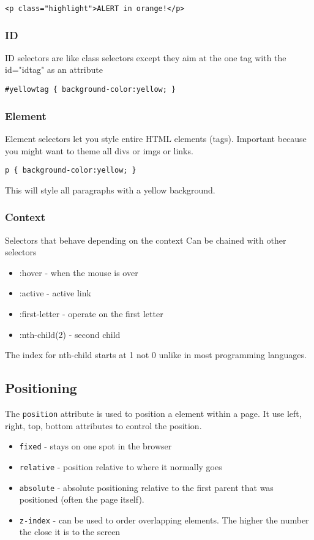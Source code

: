 \documentclass[../CMPUT-404-Notes.tex]{subfiles}
\begin{document}
\begin{verbatim}
<p class="highlight">ALERT in orange!</p>
\end{verbatim}

\subsubsection{ID}
ID selectors are like class selectors except they aim at the one tag with the id="idtag" as an attribute

\begin{verbatim}
#yellowtag { background-color:yellow; }
\end{verbatim}


\subsubsection{Element}
Element selectors let you style entire HTML elements (tags).
Important because you might want to theme all divs or imgs or links. 
\begin{verbatim}
p { background-color:yellow; }
\end{verbatim}
This will style all paragraphs with a yellow background.

\subsubsection{Context}
Selectors that behave depending on the context
Can be chained with other selectors
\begin{itemize}
  \item :hover - when the mouse is over
  \item :active - active link
  \item :first-letter - operate on the first letter
  \item :nth-child(2) - second child
\end{itemize}
\begin{Note}
  The index for nth-child starts at 1 not 0 unlike in most programming languages. 
\end{Note}

\subsection{Positioning}
The \texttt{position} attribute is used to position a element within a page.
It use left, right, top, bottom attributes to control the position.
\begin{itemize}
  \item \texttt{fixed} - stays on one spot in the browser
  \item \texttt{relative} - position relative to where it normally goes
  \item \texttt{absolute} - absolute positioning relative to the first parent that was positioned (often the page itself).
  \item \texttt{z-index} - can be used to order overlapping elements. The higher the number the close it is to the screen 
\end{itemize}
\end{document}

